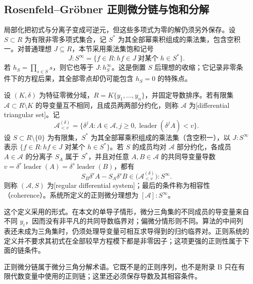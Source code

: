 \subsection{Rosenfeld–Gröbner 正则微分链与饱和分解}
\label{b3:subsec:E03:02}

局部化把初式与分离子变成可逆元，但这些多项式为零的解仍须另外保存。设 \(S\subset R\) 为有限非零多项式集合，记 \(S^*\) 为其全部幂乘积组成的乘法集，包含空积一。对普通理想 \(J\subseteq R\)，本节采用乘法集饱和记号
\[
	J:S^\infty=\{f\in R:hf\in J\;\text{对某个}\;h\in S^*\}.
\]
若 \(h_S=\prod_{s\in S}s\)，则它也等于 \(J:h_S^\infty\)。这是倒置 \(S\) 后理想的收缩；它记录非零条件下的方程后果，其全部零点却仍可能包含 \(h_S=0\) 的特殊点。

\begin{definition}\label{b3:def:regular-differential-system}
	设 \((K,\delta)\) 为特征零微分域，\(R=K\{y_1,\ldots,y_n\}\)，并固定导数排序。若有限集 \(\mathcal A\subset R\setminus K\) 的导变量互不相同，且成员两两部分约化，则称 \(\mathcal A\) 为[differential triangular set]。记
	\[
		\mathcal A_{<v}^{(\delta)} =\{\delta^jA:A\in\mathcal A,j\ge0, \operatorname{leader}(\delta^jA)<v\}.
	\]
	设 \(S\subset R\setminus\{0\}\) 为有限集，\(S^*\) 为其全部幂乘积组成的乘法集（含空积一），以 \(J:S^\infty\) 表示 \(\{f\in R:hf\in J\text{ 对某个 }h\in S^*\}\)。若 \(S\) 的成员均对 \(\mathcal A\) 部分约化，各成员 \(A\in\mathcal A\) 的分离子 \(S_A\) 属于 \(S^*\)，并且对任意 \(A,B\in\mathcal A\) 的共同导变量导数 \(v=\delta^r\operatorname{leader}(A)=\delta^s\operatorname{leader}(B)\)，都有
	\[
		S_B\delta^rA-S_A\delta^sB \in\bigl(\mathcal A_{<v}^{(\delta)}\bigr):S^\infty.
	\]
	则称 \((\mathcal A,S)\) 为[regular differential system]；最后的条件称为相容性（coherence）。系统所定义的正则微分理想为 \([\mathcal A]:S^\infty\)。
\end{definition}

这个定义采用\cite[Definition 4.7]{Hubert2003DifferentialSystems}的形式。在本文的单导子情形，微分三角集的不同成员的导变量来自不同 \(y_i\)，因而没有非平凡的共同导数临界对；偏微分情形则不同。算法的中间列表还未成为三角集时，仍须处理导变量可相互求导得到的归约临界对。正则系统的定义并不要求其初式在全部较早方程模下都是非零因子；这项更强的正则性属于下面的链条件。

正则微分链属于微分三角分解术语。它既不是的正则序列，也不是附录 B 只在有限代数变量中使用的正则链；这里还必须保存导数及其相容条件。

